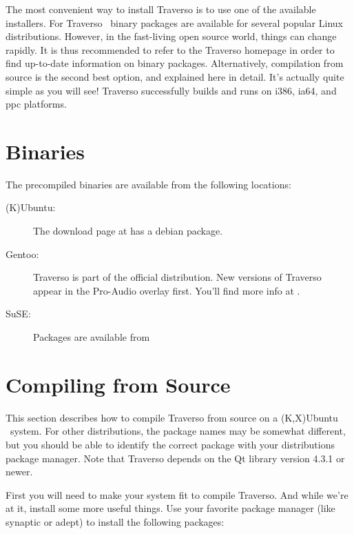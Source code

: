 The most convenient way to install Traverso is to use one of the available installers. For Traverso \Version\ binary packages are available for several popular Linux distributions. However, in the fast-living open source world, things can change rapidly. It is thus recommended to refer to the Traverso homepage \cite{trav-hp} in order to find up-to-date information on binary packages. Alternatively, compilation from source is the second best option, and explained here in detail. It's actually quite simple as you will see! Traverso successfully builds and runs on i386, ia64, and ppc platforms.

\section{Binaries}
The precompiled binaries are available from the following locations:

\begin{description}
	\item [(K)Ubuntu:] The download page at \cite{trav-hp} has a debian package.
	\item [Gentoo:] Traverso is part of the official distribution. New versions of Traverso appear in the Pro-Audio overlay first. You'll find more info at \cite{pro-audio-wiki}.
	\item [SuSE:] Packages are available from \cite{suse-ref}
\end{description}

\section{Compiling from Source}
This section describes how to compile Traverso from source on a (K,X)Ubuntu \Ubuntu\ system. For other distributions, the package names may be somewhat different, but you should be able to identify the correct package with your distributions package manager. Note that Traverso depends on the Qt library version 4.3.1 or newer.

First you will need to make your system fit to compile Traverso. And while we're at it, install some more useful things. Use your favorite package manager (like synaptic or adept) to install the following packages:

